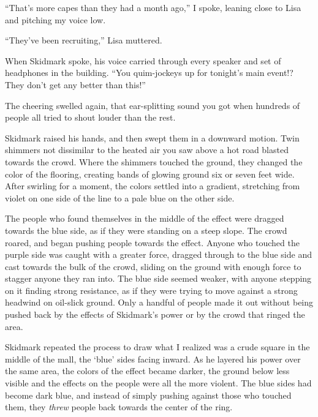 ``That's more capes than they had a month ago,'' I spoke, leaning close to Lisa and pitching my voice low.



``They've been recruiting,'' Lisa muttered.



When Skidmark spoke, his voice carried through every speaker and set of headphones in the building.  ``You quim-jockeys up for tonight's main event!?  They don't get any better than this!''



The cheering swelled again, that ear-splitting sound you got when hundreds of people all tried to shout louder than the rest.



Skidmark raised his hands, and then swept them in a downward motion.  Twin shimmers not dissimilar to the heated air you saw above a hot road blasted towards the crowd.  Where the shimmers touched the ground, they changed the color of the flooring, creating bands of glowing ground six or seven feet wide.  After swirling for a moment, the colors settled into a gradient, stretching from violet on one side of the line to a pale blue on the other side.



The people who found themselves in the middle of the effect were dragged towards the blue side, as if they were standing on a steep slope.  The crowd roared, and began pushing people towards the effect.  Anyone who touched the purple side was caught with a greater force, dragged through to the blue side and cast towards the bulk of the crowd, sliding on the ground with enough force to stagger anyone they ran into.  The blue side seemed weaker, with anyone stepping on it finding strong resistance, as if they were trying to move against a strong headwind on oil-slick ground.  Only a handful of people made it out without being pushed back by the effects of Skidmark's power or by the crowd that ringed the area.



Skidmark repeated the process to draw what I realized was a crude square in the middle of the mall, the `blue' sides facing inward.  As he layered his power over the same area, the colors of the effect became darker, the ground below less visible and the effects on the people were all the more violent.  The blue sides had become dark blue, and instead of simply pushing against those who touched them, they \emph{threw} people back towards the center of the ring.



